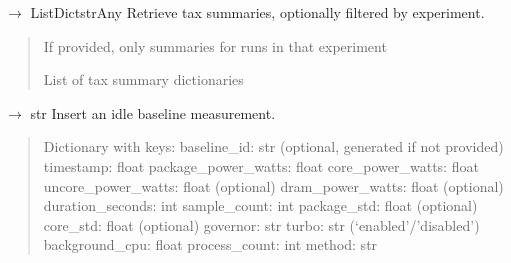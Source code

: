 \documentclass[letterpaper,10pt,english]{sphinxmanual}
\begin{document}
\begin{fulllineitems}
\begin{fulllineitems}
\label{\detokenize{core.database.base:core.database.base.DatabaseInterface.get_tax_summaries}}
\pysigstartsignatures
\pysiglinewithargsret
{}
{}
{{ $\rightarrow$ List\DUrole{p}{{[}}Dict\DUrole{p}{{[}}strAny\DUrole{p}{{]}}\DUrole{p}{{]}}}}
\pysigstopsignatures
\sphinxAtStartPar
Retrieve tax summaries, optionally filtered by experiment.
\begin{quote}\begin{description}
\sphinxAtStartPar
{} \textendash{} If provided, only summaries for runs in that experiment

\sphinxAtStartPar
List of tax summary dictionaries

\end{description}\end{quote}

\end{fulllineitems}


\begin{fulllineitems}
\label{\detokenize{core.database.base:core.database.base.DatabaseInterface.insert_baseline}}
\pysigstartsignatures
\pysiglinewithargsret
{}
{}
{{ $\rightarrow$ str}}
\pysigstopsignatures
\sphinxAtStartPar
Insert an idle baseline measurement.
\begin{quote}\begin{description}
\sphinxAtStartPar
{} \textendash{} Dictionary with keys:
\sphinxhyphen{} baseline\_id: str (optional, generated if not provided)
\sphinxhyphen{} timestamp: float
\sphinxhyphen{} package\_power\_watts: float
\sphinxhyphen{} core\_power\_watts: float
\sphinxhyphen{} uncore\_power\_watts: float (optional)
\sphinxhyphen{} dram\_power\_watts: float (optional)
\sphinxhyphen{} duration\_seconds: int
\sphinxhyphen{} sample\_count: int
\sphinxhyphen{} package\_std: float (optional)
\sphinxhyphen{} core\_std: float (optional)
\sphinxhyphen{} governor: str
\sphinxhyphen{} turbo: str (‘enabled’/’disabled’)
\sphinxhyphen{} background\_cpu: float
\sphinxhyphen{} process\_count: int
\sphinxhyphen{} method: str


\end{description}
\end{quote}
\end{fulllineitems}
\end{fulllineitems}
\end{document}
